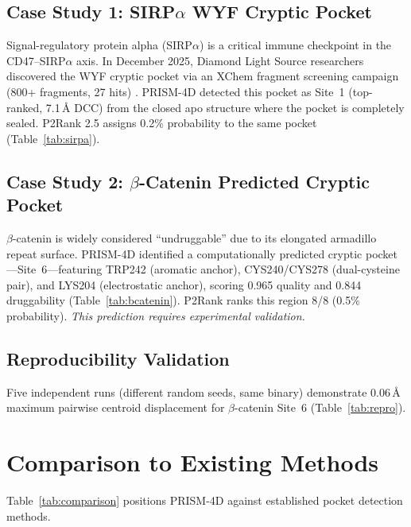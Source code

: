 \documentclass[11pt,twocolumn]{article}
\begin{document}
\subsection{Case Study 1: SIRP$\alpha$ WYF Cryptic Pocket}

Signal-regulatory protein alpha (SIRP$\alpha$) is a critical immune checkpoint in the
CD47--SIRP$\alpha$ axis. In December 2025, Diamond Light Source researchers discovered the WYF
cryptic pocket via an XChem fragment screening campaign (800+ fragments, 27 hits)
\citep{sirpa_xchem2025}. PRISM-4D detected this pocket as Site~1 (top-ranked, 7.1\,\AA{} DCC)
from the closed apo structure where the pocket is completely sealed. P2Rank 2.5 assigns 0.2\%
probability to the same pocket (Table~\ref{tab:sirpa}).

\subsection{Case Study 2: $\beta$-Catenin Predicted Cryptic Pocket}

$\beta$-catenin is widely considered ``undruggable'' due to its elongated armadillo repeat
surface. PRISM-4D identified a computationally predicted cryptic pocket---Site~6---featuring
TRP242 (aromatic anchor), CYS240/CYS278 (dual-cysteine pair), and LYS204 (electrostatic
anchor), scoring 0.965 quality and 0.844 druggability (Table~\ref{tab:bcatenin}). P2Rank
ranks this region 8/8 (0.5\% probability). \textit{This prediction requires experimental
validation.}

\subsection{Reproducibility Validation}

Five independent runs (different random seeds, same binary) demonstrate 0.06\,\AA{} maximum
pairwise centroid displacement for $\beta$-catenin Site~6 (Table~\ref{tab:repro}).

\section{Comparison to Existing Methods}

Table~\ref{tab:comparison} positions PRISM-4D against established pocket detection methods.
\end{document}
